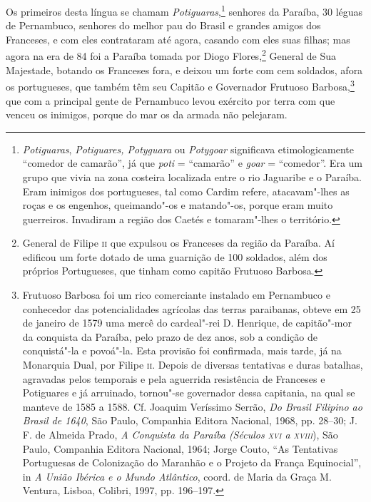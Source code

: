  Os primeiros desta língua se chamam \textit{Potiguaras},\footnote{ \textit{Potiguaras}, 
\textit{Potiguares, Potyguara} ou \textit{Potygoar} 
significava etimologicamente ``comedor de camarão'', já
que \textit{poti} = ``camarão'' e \textit{goar} = ``comedor''. Era um grupo
que vivia na zona costeira localizada entre o rio Jaguaribe e o
Paraíba. Eram inimigos dos portugueses, tal como Cardim refere,
atacavam"-lhes as roças e os engenhos, queimando"-os e matando"-os, porque
eram muito guerreiros. Invadiram a região dos Caetés e tomaram"-lhes o
território.} senhores da Paraíba, 30 léguas de Pernambuco,
senhores do melhor pau do Brasil e grandes amigos dos Franceses, e com
eles contrataram até agora, casando com eles suas filhas; mas agora na
era de 84 foi a Paraíba tomada por Diogo Flores,\footnote{ General 
de Filipe \textsc{ii} que expulsou os Franceses da região da Paraíba. Aí
edificou um forte dotado de uma guarnição de 100 soldados, além dos
próprios Portugueses, que tinham como capitão Frutuoso Barbosa.} 
General de Sua Majestade, botando os Franceses fora, e deixou um forte
com cem soldados, afora os portugueses, que também têm seu Capitão e
Governador Frutuoso Barbosa,\footnote{ Frutuoso Barbosa foi um rico
comerciante instalado em Pernambuco e conhecedor das potencialidades
agrícolas das terras paraibanas, obteve em 25 de janeiro de 1579 uma
mercê do cardeal"-rei D. Henrique, de capitão"-mor da conquista da
Paraíba, pelo prazo de dez anos, sob a condição de conquistá"-la e
povoá"-la. Esta provisão foi confirmada, mais tarde, já na Monarquia
Dual, por Filipe \textsc{ii}. Depois de diversas tentativas e duras batalhas,
agravadas pelos temporais e pela aguerrida resistência de Franceses e
Potiguares e já arruinado, tornou"-se governador dessa capitania, na
qual se manteve de 1585 a 1588. Cf. Joaquim Veríssimo Serrão,
\textit{Do Brasil Filipino ao Brasil de 1640}, São Paulo, Companhia
Editora Nacional, 1968, pp. 28--30; J. F. de Almeida Prado, \textit{A
Conquista da Paraíba (Séculos \textsc{xvi} a \textsc{xviii}}), São Paulo, Companhia
Editora Nacional, 1964; Jorge Couto, ``As Tentativas Portuguesas de
Colonização do Maranhão e o Projeto da França Equinocial'', in
\textit{A União Ibérica e o Mundo Atlântico}, coord. de Maria da Graça
M. Ventura, Lisboa, Colibri, 1997, pp. 196--197.} que com a principal
gente de Pernambuco levou exército por terra com que venceu os
inimigos, porque do mar os da armada não pelejaram. 

